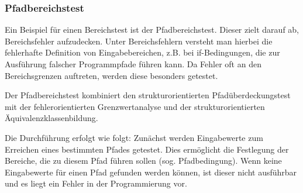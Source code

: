 \documentclass[	%
		fontsize=11pt,  %
		a4paper,	    %
		ngerman,		%
		sans,			%
		f4,				%
	]{HsH-report}		%
\begin{document}
\newpage

\subsubsection{Pfadbereichstest}
Ein Beispiel für einen Bereichstest ist der Pfadbereichstest. Dieser zielt
darauf ab, Bereichsfehler aufzudecken. Unter Bereichsfehlern versteht man
hierbei die fehlerhafte Definition von Eingabebereichen, z.B. bei
if-Bedingungen, die zur Ausführung falscher Programmpfade führen kann. Da
Fehler oft an den Bereichsgrenzen auftreten, werden diese besonders getestet.
\cite{liggesmeyer:qualitaet}

Der Pfadbereichstest kombiniert den strukturorientierten Pfadüberdeckungstest
mit der fehlerorientierten Grenzwertanalyse und der strukturorientierten
Äquivalenzklassenbildung. \cite{liggesmeyer:qualitaet}

Die Durchführung erfolgt wie folgt: Zunächst werden Eingabewerte zum Erreichen
eines bestimmten Pfades getestet. Dies ermöglicht die Festlegung der Bereiche,
die zu diesem Pfad führen sollen (sog. Pfadbedingung). Wenn keine Eingabewerte
für einen Pfad gefunden werden können, ist dieser nicht ausführbar und es liegt
ein Fehler in der Programmierung vor. \cite{liggesmeyer:qualitaet}

\printbibliography
\end{document}
